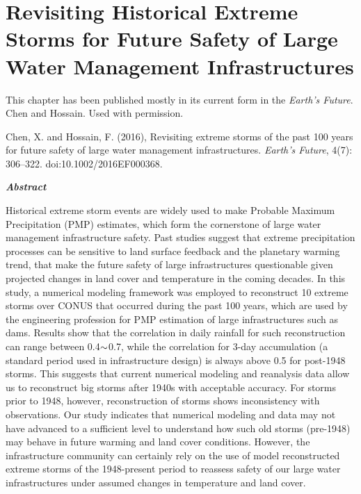 \chapter {Revisiting Historical Extreme Storms for Future Safety of Large Water Management Infrastructures}
\label{ch:EF}


 
This chapter has been published mostly in its current form in the \textit{Earth's Future}. \textcopyright Chen and Hossain. Used with permission.\\

\bigbreak

\noindent
{}
\setlength{\hangindent}{2em}
Chen, X. and Hossain, F. (2016), Revisiting extreme storms of the past 100 years for future safety of large water management infrastructures. \textit{Earth's Future}, 4(7): 306–322. doi:10.1002/2016EF000368.

\vspace{10mm}

\noindent
\textit{\textbf{Abstract}}
 
Historical extreme storm events are widely used to make Probable Maximum Precipitation (PMP) estimates, which form the cornerstone of large water management infrastructure safety. Past studies suggest that extreme precipitation processes can be sensitive to land surface feedback and the planetary warming trend, that make the future safety of large infrastructures questionable given projected changes in land cover and temperature in the coming decades. In this study, a numerical modeling framework was employed to reconstruct 10 extreme storms over CONUS that occurred during the past 100 years, which are used by the engineering profession for PMP estimation of large infrastructures such as dams. Results show that the correlation in daily rainfall for such reconstruction can range between 0.4$\scriptsize{\sim}$0.7, while the correlation for 3-day accumulation (a standard period used in infrastructure design) is always above 0.5 for post-1948 storms. This suggests that current numerical modeling and reanalysis data allow us to reconstruct big storms after 1940s with acceptable accuracy. For storms prior to 1948, however, reconstruction of storms shows inconsistency with observations. Our study indicates that numerical modeling and data may not have advanced to a sufficient level to understand how such old storms (pre-1948) may behave in future warming and land cover conditions. However, the infrastructure community can certainly rely on the use of model reconstructed extreme storms of the 1948-present period to reassess safety of our large water infrastructures under assumed changes in temperature and land cover.

